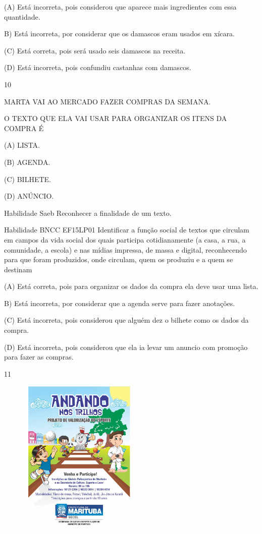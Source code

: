 {{{{{{(A) Está incorreta, pois considerou que aparece mais ingredientes com
essa quantidade.

B) Está incorreta, por considerar que os damascos eram usados em xícara.

(C) Está correta, pois será usado seis damascos na receita.

(D) Está incorreta, pois confundiu castanhas com damascos.

\num{10}

MARTA VAI AO MERCADO FAZER COMPRAS DA SEMANA.

O TEXTO QUE ELA VAI USAR PARA ORGANIZAR OS ITENS DA COMPRA É

(A) LISTA.

(B) AGENDA.

(C) BILHETE.

(D) ANÚNCIO.

Habilidade Saeb Reconhecer a finalidade de um texto.

Habilidade BNCC EF15LP01 Identificar a função social de textos que
circulam em campos da vida social dos quais participa cotidianamente (a
casa, a rua, a comunidade, a escola) e nas mídias impressa, de massa e
digital, reconhecendo para que foram produzidos, onde circulam, quem os
produziu e a quem se destinam

(A) Está correta, pois para organizar os dados da compra ela deve usar
uma lista.

B) Está incorreta, por considerar que a agenda serve para fazer
anotações.

(C) Está incorreta, pois considerou que alguém dez o bilhete como os
dados da compra.

(D) Está incorreta, pois considerou que ela ia levar um anuncio com
promoção para fazer as compras.

\num{11}

\includegraphics[width=3.11515in,height=2.97237in]{media/image170.jpeg}

}}}}}}
